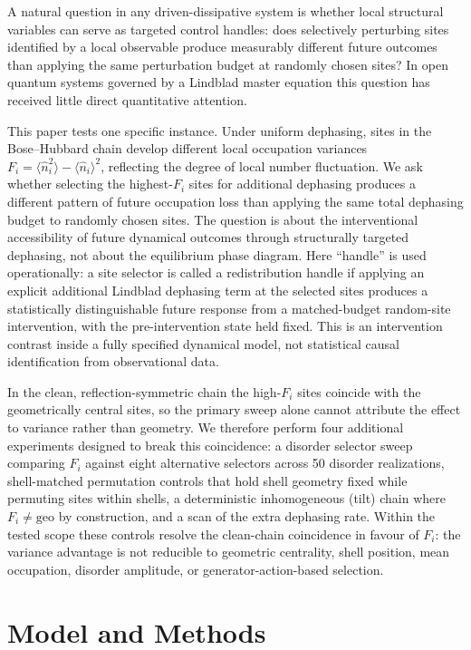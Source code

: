 \documentclass[aps,pra,reprint,amsmath,amssymb,longbibliography,floatfix]{revtex4-2}
\newcommand{\Fi}{F_i}
\newcommand{\nop}{\hat{n}}
\begin{document}
A natural question in any driven-dissipative system is whether local
structural variables can serve as targeted control handles: does
selectively perturbing sites identified by a local observable produce
measurably different future outcomes than applying the same perturbation
budget at randomly chosen sites?
In open quantum systems governed by a Lindblad master equation this
question has received little direct quantitative attention.

This paper tests one specific instance.
Under uniform dephasing, sites in the Bose--Hubbard chain develop different
local occupation variances $\Fi = \langle\nop_i^2\rangle -
\langle\nop_i\rangle^2$, reflecting the degree of local number
fluctuation.
We ask whether selecting the highest-$\Fi$ sites for additional dephasing
produces a different pattern of future occupation loss than applying the
same total dephasing budget to randomly chosen sites.
The question is about the interventional accessibility of future dynamical
outcomes through structurally targeted dephasing, not about the
equilibrium phase diagram.
Here ``handle'' is used operationally: a site selector is called a
redistribution handle if applying an explicit additional Lindblad
dephasing term at the selected sites produces a statistically
distinguishable future response from a matched-budget random-site
intervention, with the pre-intervention state held fixed.
This is an intervention contrast inside a fully specified dynamical
model, not statistical causal identification from observational data.

In the clean, reflection-symmetric chain the high-$\Fi$ sites coincide with
the geometrically central sites, so the primary sweep alone cannot
attribute the effect to variance rather than geometry.
We therefore perform four additional experiments designed to break this
coincidence: a disorder selector sweep comparing $\Fi$ against eight
alternative selectors across 50 disorder realizations, shell-matched
permutation controls that hold shell geometry fixed while permuting sites
within shells, a deterministic inhomogeneous (tilt) chain where
$\Fi\neq\mathrm{geo}$ by construction, and a scan of the extra dephasing
rate.
Within the tested scope these controls resolve the clean-chain coincidence
in favour of $\Fi$: the variance advantage is not reducible to geometric
centrality, shell position, mean occupation, disorder amplitude, or
generator-action-based selection.

\section{Model and Methods}
\label{sec:methods}
\end{document}
